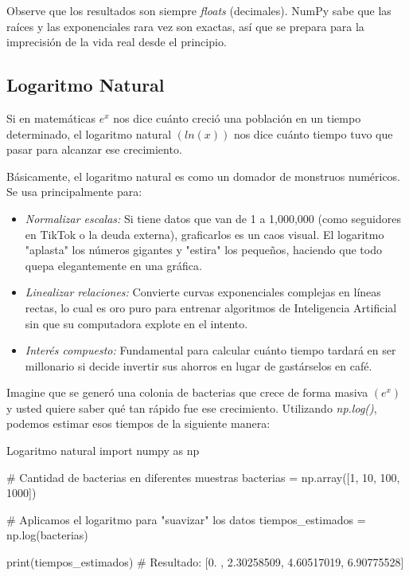 Observe que los resultados son siempre \textit{floats} (decimales). NumPy sabe que las raíces y las exponenciales rara vez son exactas, así que se prepara para la imprecisión de la vida real desde el principio.



\subsection{Logaritmo Natural}

Si en matemáticas \(e^x\) nos dice cuánto creció una población en un tiempo determinado, el logaritmo natural \((ln(x))\) nos dice cuánto tiempo tuvo que pasar para alcanzar ese crecimiento.

Básicamente, el logaritmo natural es como un domador de monstruos numéricos. Se usa principalmente para:
\begin{itemize}
\item \textit{Normalizar escalas:} Si tiene datos que van de 1 a 1,000,000 (como seguidores en TikTok o la deuda externa), graficarlos es un caos visual. El logaritmo "aplasta" los números gigantes y "estira" los pequeños, haciendo que todo quepa elegantemente en una gráfica.
\item \textit{Linealizar relaciones:} Convierte curvas exponenciales complejas en líneas rectas, lo cual es oro puro para entrenar algoritmos de Inteligencia Artificial sin que su computadora explote en el intento.
\item \textit{Interés compuesto:} Fundamental para calcular cuánto tiempo tardará en ser millonario si decide invertir sus ahorros en lugar de gastárselos en café.
\end{itemize}
    

Imagine que se generó una colonia de bacterias que crece de forma masiva \((e^x)\) y usted quiere saber qué tan rápido fue ese crecimiento. Utilizando \textit{np.log()}, podemos estimar esos tiempos de la siguiente manera:

\begin{pycode}{Logaritmo natural}
import numpy as np

# Cantidad de bacterias en diferentes muestras
bacterias = np.array([1, 10, 100, 1000])

# Aplicamos el logaritmo para "suavizar" los datos
tiempos_estimados = np.log(bacterias)

print(tiempos_estimados)
# Resultado: [0. , 2.30258509, 4.60517019, 6.90775528]
\end{pycode}

